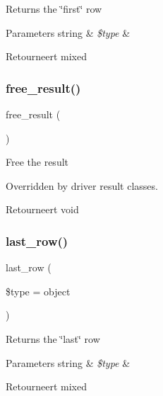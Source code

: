 Returns the \char`\"{}first\char`\"{} row


\begin{DoxyParams}[1]{Parameters}
string & {\em \$type} & \\
\hline
\end{DoxyParams}
\begin{DoxyReturn}{Retourneert}
mixed 
\end{DoxyReturn}
\mbox{\label{class_c_i___d_b__result_aad2d98d6beb3d6095405356c6107b473}} 
\subsubsection{\texorpdfstring{free\_result()}{free\_result()}}
{\footnotesize\ttfamily free\+\_\+result (\begin{DoxyParamCaption}{ }\end{DoxyParamCaption})}

Free the result

Overridden by driver result classes.

\begin{DoxyReturn}{Retourneert}
void 
\end{DoxyReturn}
\mbox{\label{class_c_i___d_b__result_a2c420342d5b577d91b6b993be86f68c0}} 
\subsubsection{\texorpdfstring{last\_row()}{last\_row()}}
{\footnotesize\ttfamily last\+\_\+row (\begin{DoxyParamCaption}\item[{}]{\$type = {\ttfamily \textquotesingle{}object\textquotesingle{}} }\end{DoxyParamCaption})}

Returns the \char`\"{}last\char`\"{} row


\begin{DoxyParams}[1]{Parameters}
string & {\em \$type} & \\
\hline
\end{DoxyParams}
\begin{DoxyReturn}{Retourneert}
mixed 
\end{DoxyReturn}
\mbox{\label{class_c_i___d_b__result_a50b54eb4ea7cfd039740f532988ea776}} 
